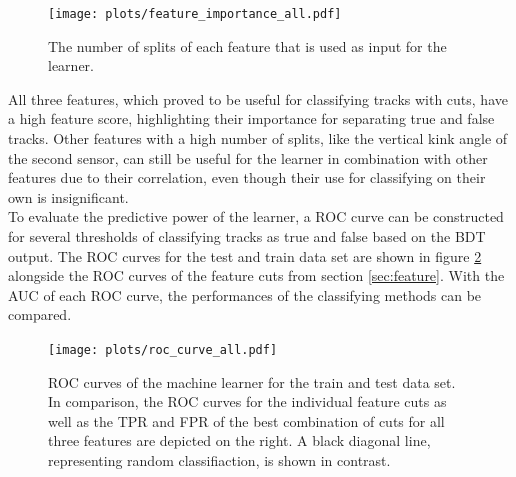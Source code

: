 \begin{figure}
  \centering
  \texttt{[image: plots/feature\_importance\_all.pdf]}
  \caption{The number of splits of each feature that is used as input for the learner.}
  \label{fig:importance}
\end{figure}

All three features, which proved to be useful for classifying tracks with cuts, have a high feature score, highlighting their importance for separating true and false tracks.
Other features with a high number of splits, like the vertical kink angle of the second sensor, can still be useful for the learner in combination with other features due to their
correlation, even though their use for classifying on their own is insignificant. \\

To evaluate the predictive power of the learner, a ROC curve can be constructed for several thresholds of classifying tracks as true and false based on the BDT
output. The ROC curves for the test and train data set are shown in figure \ref{fig:auc_comparison} alongside the ROC curves of the feature cuts from section \ref{sec:feature}.
With the AUC of each ROC curve, the performances of the classifying methods can be compared. %

\begin{figure}
  \centering
  \texttt{[image: plots/roc\_curve\_all.pdf]}
    \caption{ROC curves of the machine learner for the train and test data set. In comparison, the ROC curves for the individual feature cuts as well as the
    TPR and FPR of the best combination of cuts for all three features are depicted on the right. A black diagonal line, representing random classifiaction, is shown
    in contrast.}
  \label{fig:auc_comparison}
\end{figure}


